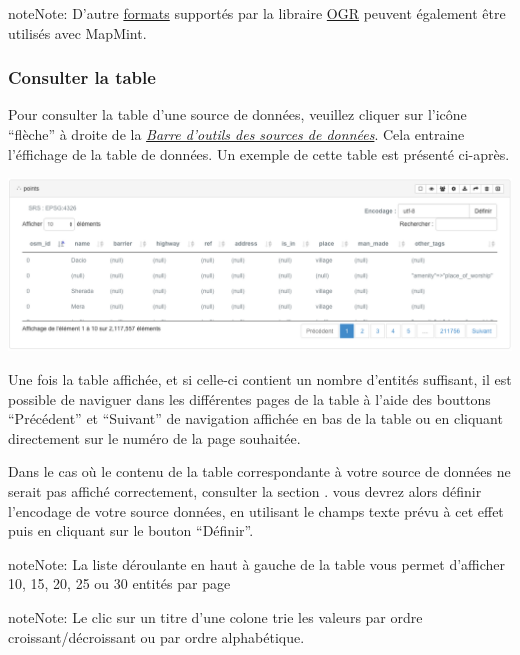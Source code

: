 \documentclass[letterpaper,10pt,french]{sphinxmanual}
\begin{document}
\begin{notice}{note}{Note:}
D'autre \href{http://www.gdal.org/ogr/ogr\_formats.html}{formats} supportés par la libraire \href{http://www.gdal.org/ogr}{OGR} peuvent également être utilisés avec MapMint.
\end{notice}


\subsubsection{Consulter la table}
\label{data/datasources:consulter-la-table}
Pour consulter la table d'une source de données, veuillez cliquer sur
l'icône ``flèche'' à droite de la {\hyperref[data/datasources:datasource-table-label]{\emph{Barre d'outils des sources de données}}}. Cela
entraine l'éffichage de la table de données. Un exemple de cette
table est présenté ci-après.

\includegraphics[width=1.000\linewidth]{view-datasource-table.png}

Une fois la table affichée, et si celle-ci contient un nombre
d'entités suffisant, il est possible de naviguer dans les différentes
pages de la table à l'aide des bouttons ``Précédent'' et ``Suivant'' de
navigation affichée en bas de la table ou en cliquant directement sur
le numéro de la page souhaitée.

Dans le cas où le contenu de la table correspondante à votre source de
données ne serait pas affiché correctement, consulter la section
. vous devrez alors définir
l'encodage de votre source données, en utilisant le champs texte prévu
à cet effet puis en cliquant sur le bouton ``Définir''.

\begin{notice}{note}{Note:}
La liste déroulante en haut à gauche de la table vous permet d'afficher 10, 15, 20, 25 ou 30 entités par page
\end{notice}

\begin{notice}{note}{Note:}
Le clic sur un titre d'une colone trie les valeurs par ordre croissant/décroissant ou par ordre alphabétique.
\end{notice}
\end{document}
